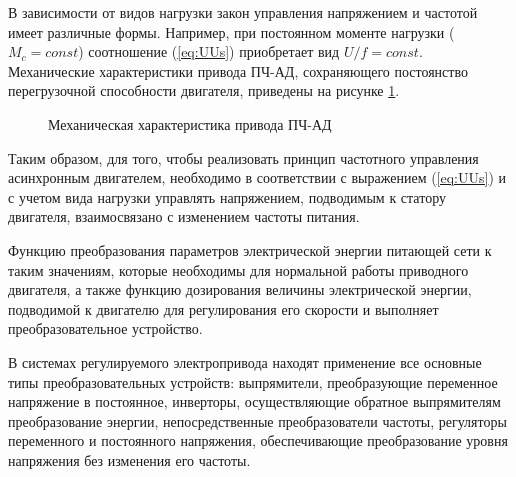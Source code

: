         В зависимости от видов нагрузки закон управления напряжением и частотой
        имеет различные формы. Например, при постоянном моменте нагрузки
        ($M_c=const$) соотношение (\ref{eq:UUs}) приобретает вид $U/f=const$.
        Механические характеристики привода ПЧ-АД, сохраняющего постоянство
        перегрузочной способности двигателя, приведены
        на рисунке \ref{fig:mech}.
        \vspace{1cm}

        \begin{figure}[h!]
            \caption{Механическая характеристика привода ПЧ-АД}
            \label{fig:mech}
        \end{figure}

        Таким образом, для того, чтобы реализовать принцип частотного
        управления асинхронным двигателем, необходимо в соответствии с
        выражением (\ref{eq:UUs}) и с учетом вида нагрузки управлять напряжением,
        подводимым к статору двигателя, взаимосвязано с изменением частоты
        питания.

        Функцию преобразования параметров электрической энергии питающей сети к
        таким значениям, которые необходимы для нормальной работы приводного
        двигателя, а также функцию дозирования величины электрической энергии,
        подводимой к двигателю для регулирования его скорости и выполняет
        преобразовательное устройство.

        В системах регулируемого электропривода находят применение все основные
        типы преобразовательных устройств: выпрямители, преобразующие
        переменное напряжение в постоянное, инверторы, осуществляющие обратное
        выпрямителям преобразование энергии, непосредственные преобразователи
        частоты, регуляторы переменного и постоянного напряжения,
        обеспечивающие преобразование уровня напряжения без изменения его
        частоты.

